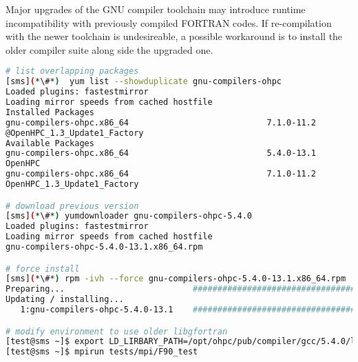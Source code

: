 \begin{center}
\begin{tcolorbox}[]
\small Major upgrades of the GNU compiler toolchain may introduce runtime 
incompatibility with previously compiled FORTRAN codes. If re-compilation with the 
newer toolchain is undesireable, a possible workaround is to install the older 
compiler suite along side the upgraded one.

\begin{lstlisting}[language=bash,keywords={}]
# list overlapping packages
[sms](*\#*)  yum list --showduplicate gnu-compilers-ohpc
Loaded plugins: fastestmirror
Loading mirror speeds from cached hostfile
Installed Packages
gnu-compilers-ohpc.x86_64                            7.1.0-11.2
@OpenHPC_1.3_Update1_Factory
Available Packages
gnu-compilers-ohpc.x86_64                            5.4.0-13.1
OpenHPC                     
gnu-compilers-ohpc.x86_64                            7.1.0-11.2
OpenHPC_1.3_Update1_Factory

# download previous version
[sms](*\#*) yumdownloader gnu-compilers-ohpc-5.4.0
Loaded plugins: fastestmirror
Loading mirror speeds from cached hostfile
gnu-compilers-ohpc-5.4.0-13.1.x86_64.rpm                                       |  44 MB  00:00:02     

# force install
[sms](*\#*) rpm -ivh --force gnu-compilers-ohpc-5.4.0-13.1.x86_64.rpm
Preparing...                          ################################# [100%]
Updating / installing...
   1:gnu-compilers-ohpc-5.4.0-13.1    ################################# [100%]

# modify environment to use older libgfortran
[test@sms ~]$ export LD_LIRBARY_PATH=/opt/ohpc/pub/compiler/gcc/5.4.0/lib64:${LD_LIBRARY_PATH}
[test@sms ~]$ mpirun tests/mpi/F90_test
\end{lstlisting}
\end{tcolorbox}
\end{center}
